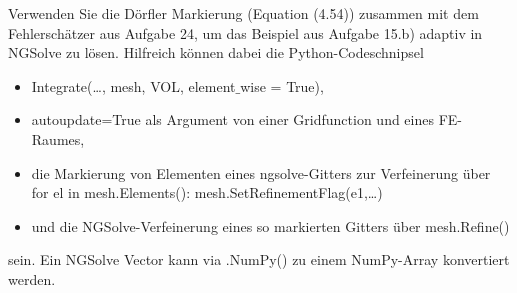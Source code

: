 
\begin{exercise}

Verwenden Sie die Dörfler Markierung (Equation (4.54)) zusammen mit dem
Fehlerschätzer aus Aufgabe 24, um das Beispiel aus Aufgabe 15.b) adaptiv in
NGSolve zu lösen. Hilfreich können dabei die Python-Codeschnipsel
\begin{itemize}
  \item Integrate(\dots, mesh, VOL, element$\_$wise = True),
  \item autoupdate=True als Argument von einer Gridfunction und eines FE-Raumes,
  \item die Markierung von Elementen eines ngsolve-Gitters zur Verfeinerung über \\
  for el in mesh.Elements(): mesh.SetRefinementFlag(e1,\dots)
  \item und die NGSolve-Verfeinerung eines so markierten Gitters über mesh.Refine()
\end{itemize}
sein. Ein NGSolve Vector kann via .NumPy() zu einem NumPy-Array konvertiert werden.
\end{exercise}


\begin{solution}

\phantom{}

\end{solution}


